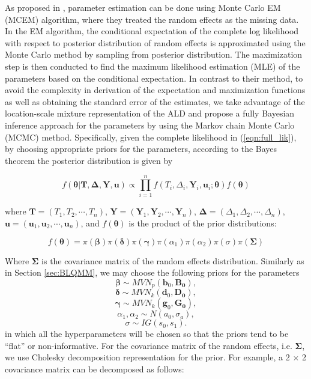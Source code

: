 As proposed in \citep{Alessio2014qrjm}, parameter estimation can be done using Monte Carlo EM (MCEM) algorithm, where they treated the random effects as the missing data. In the EM algorithm, the conditional expectation of the complete log likelihood with respect to posterior distribution of random effects is approximated using the Monte Carlo method by sampling from posterior distribution. The maximization step is then conducted to find the maximum likelihood estimation (MLE) of the parameters based on the conditional expectation.  In contrast to their method, to avoid the complexity in derivation of the expectation and maximization functions as well as obtaining the standard error of the estimates, we take advantage of the location-scale mixture representation of the ALD and propose a fully Bayesian inference approach for the parameters by using the Markov chain Monte Carlo (MCMC) method. Specifically, given the complete likelihood in (\ref{eqn:full_lik}), by choosing appropriate priors for the parameters, according to the Bayes theorem the posterior distribution is given by

\begin{equation}\label{eqn:posterior}
f(\boldsymbol{\theta}|\boldsymbol{T}, \boldsymbol{\Delta}, \boldsymbol{Y}, \boldsymbol{u})\propto \prod_{i=1}^n f(T_i, \Delta_i, \boldsymbol{Y}_i, \boldsymbol{u}_i;\boldsymbol{\theta}) f(\boldsymbol{\theta})
\end{equation}

where $\boldsymbol{T}=(T_1, T_2, \cdots, T_n)$, $\boldsymbol{Y}=(\boldsymbol{Y}_1, \boldsymbol{Y}_2, \cdots, \boldsymbol{Y}_n)$, $\boldsymbol{\Delta} =(\Delta_1, \Delta_2, \cdots, \Delta_n)$, $\boldsymbol{u}=(\boldsymbol{u}_1, \boldsymbol{u}_2, \cdots, \boldsymbol{u}_n)$, and $f(\boldsymbol{\theta})$ is the product of the prior distributions:

\[f(\boldsymbol{\theta})=\pi(\boldsymbol{\beta})\pi(\boldsymbol{\delta})\pi(\boldsymbol{\gamma})\pi(\alpha_1)\pi(\alpha_2)\pi(\sigma)\pi(\boldsymbol{\Sigma})\]

Where $\boldsymbol{\Sigma}$ is the covariance matrix of the random effects distribution. Similarly as in Section \ref{sec:BLQMM}, we may choose the following priors for the parameters
\[\boldsymbol{\beta} \sim MVN_p({\boldsymbol b_0}, \boldsymbol{B_0}),\]
\[\boldsymbol{\delta} \sim MVN_k({\boldsymbol d_0}, \boldsymbol{D_0}),\]
\[\boldsymbol{\gamma} \sim MVN_k({\boldsymbol g_0}, \boldsymbol{G_0}),\]
\[\alpha_1, \alpha_2\sim N(a_0, \sigma_a),\]
\[\sigma\sim IG(s_0, s_1).\]
in which all the hyperparameters will be chosen so that the priors tend to be ``flat'' or non-informative. For the covariance matrix of the random effects, i.e. $\boldsymbol{\Sigma}$, we use Cholesky decomposition representation for the prior. For example, a 2 $\times$ 2 covariance matrix can be decomposed as follows: 

